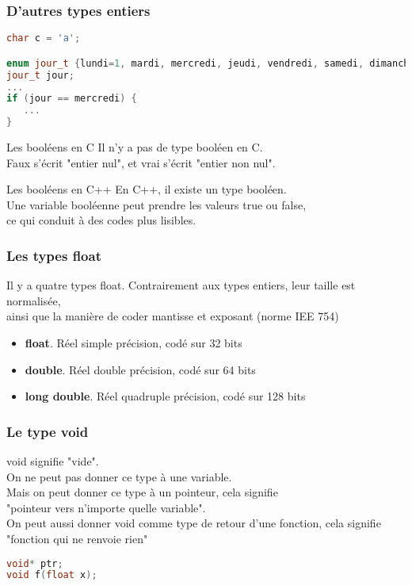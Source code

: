 \documentclass{beamer}
\begin{document}
\begin{frame}[fragile=singleslide,shrink=20]
\frametitle {D'autres types entiers}
\begin{lstlisting}[language=c++]
char c = 'a';

enum jour_t {lundi=1, mardi, mercredi, jeudi, vendredi, samedi, dimanche};
jour_t jour;
...
if (jour == mercredi) {
   ...
}
\end{lstlisting}
\begin{block}{Les booléens en C}
Il n'y a pas de type booléen en C. \\
Faux s'écrit "entier nul", et vrai s'écrit "entier non nul".
\end{block}
\begin{block}{Les booléens en C++}
En C++, il existe un type booléen. \\
Une variable booléenne peut prendre les valeurs true ou false, \\
ce qui conduit à des codes plus lisibles.
\end{block}
\end{frame}

\begin{frame}[fragile=singleslide,shrink=20]
\frametitle {Les types float}
Il y a quatre types float. Contrairement aux types entiers, leur taille est normalisée, \\ 
ainsi que la manière de coder mantisse et exposant (norme IEE 754)
\begin{itemize}
\item{\textbf{float}. Réel simple précision, codé sur 32 bits}
\item{\textbf{double}. Réel double précision, codé sur 64 bits}
\item{\textbf{long double}. Réel quadruple précision, codé sur 128 bits}
\end{itemize}
\end{frame}

\begin{frame}[fragile=singleslide,shrink=20]
\frametitle {Le type void}
void signifie "vide". \\
On ne peut pas donner ce type à une variable. \\
Mais on peut donner ce type à un pointeur, cela signifie \\ "pointeur vers n'importe quelle variable". \\
On peut aussi donner void comme type de retour d'une fonction, cela signifie \\
"fonction qui ne renvoie rien"
\begin{lstlisting}[language=c++]
void* ptr;
void f(float x);
\end{lstlisting}
\end{frame}
\end{document}
